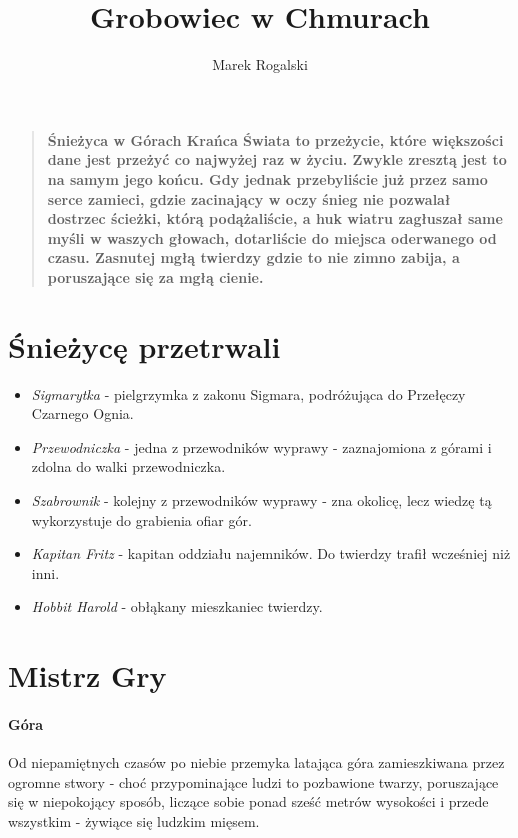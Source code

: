 \documentclass[12pt,a4paper]{article}
\title{Grobowiec w Chmurach}
\author{Marek Rogalski}
\begin{document}
\maketitle

\begin{quote}
\large \bf
{\huge Ś}nieżyca w Górach Krańca Świata to przeżycie, które większości dane
jest przeżyć co najwyżej raz w życiu. Zwykle zresztą jest to na samym
jego końcu. Gdy jednak przebyliście już przez samo serce zamieci,
gdzie zacinający w oczy śnieg nie pozwalał dostrzec ścieżki, którą
podążaliście, a huk wiatru zagłuszał same myśli w waszych głowach,
dotarliście do miejsca oderwanego od czasu. Zasnutej mgłą twierdzy
gdzie to nie zimno zabija, a poruszające się za mgłą cienie.
\end{quote}

\section*{Śnieżycę przetrwali}

\begin{itemize}
\item \emph{Sigmarytka} - pielgrzymka z zakonu Sigmara, podróżująca do
  Przełęczy Czarnego Ognia.
\item \emph{Przewodniczka} - jedna z przewodników wyprawy -
  zaznajomiona z górami i zdolna do walki przewodniczka.
\item \emph{Szabrownik} - kolejny z przewodników wyprawy - zna
  okolicę, lecz wiedzę tą wykorzystuje do grabienia ofiar gór.
\item \emph{Kapitan Fritz} - kapitan oddziału najemników. Do twierdzy
  trafił wcześniej niż inni.
\item \emph{Hobbit Harold} - obłąkany mieszkaniec twierdzy.
\end{itemize}

\section*{\color{red} Mistrz Gry}

\paragraph{Góra} 
Od niepamiętnych czasów po niebie przemyka latająca góra zamieszkiwana
przez ogromne stwory - choć przypominające ludzi to pozbawione twarzy,
poruszające się w niepokojący sposób, liczące sobie ponad sześć metrów
wysokości i przede wszystkim - żywiące się ludzkim mięsem.
\end{document}
